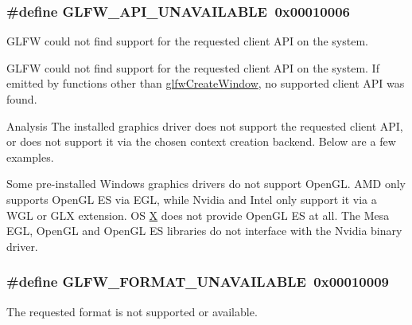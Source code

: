 \subsubsection[{G\+L\+F\+W\+\_\+\+A\+P\+I\+\_\+\+U\+N\+A\+V\+A\+I\+L\+A\+B\+L\+E}]{\setlength{\rightskip}{0pt plus 5cm}\#define G\+L\+F\+W\+\_\+\+A\+P\+I\+\_\+\+U\+N\+A\+V\+A\+I\+L\+A\+B\+L\+E~0x00010006}\label{group__errors_ga56882b290db23261cc6c053c40c2d08e}


G\+L\+F\+W could not find support for the requested client A\+P\+I on the system. 

G\+L\+F\+W could not find support for the requested client A\+P\+I on the system. If emitted by functions other than \hyperlink{group__window_ga680a02abe0e4494b6759d5703240713e}{glfw\+Create\+Window}, no supported client A\+P\+I was found.

\begin{DoxyParagraph}{Analysis}
The installed graphics driver does not support the requested client A\+P\+I, or does not support it via the chosen context creation backend. Below are a few examples.
\end{DoxyParagraph}
\begin{DoxyParagraph}{}
Some pre-\/installed Windows graphics drivers do not support Open\+G\+L. A\+M\+D only supports Open\+G\+L E\+S via E\+G\+L, while Nvidia and Intel only support it via a W\+G\+L or G\+L\+X extension. O\+S \hyperlink{structX}{X} does not provide Open\+G\+L E\+S at all. The Mesa E\+G\+L, Open\+G\+L and Open\+G\+L E\+S libraries do not interface with the Nvidia binary driver. 
\end{DoxyParagraph}
\hypertarget{group__errors_ga196e125ef261d94184e2b55c05762f14}{}
\subsubsection[{G\+L\+F\+W\+\_\+\+F\+O\+R\+M\+A\+T\+\_\+\+U\+N\+A\+V\+A\+I\+L\+A\+B\+L\+E}]{\setlength{\rightskip}{0pt plus 5cm}\#define G\+L\+F\+W\+\_\+\+F\+O\+R\+M\+A\+T\+\_\+\+U\+N\+A\+V\+A\+I\+L\+A\+B\+L\+E~0x00010009}\label{group__errors_ga196e125ef261d94184e2b55c05762f14}


The requested format is not supported or available. 

